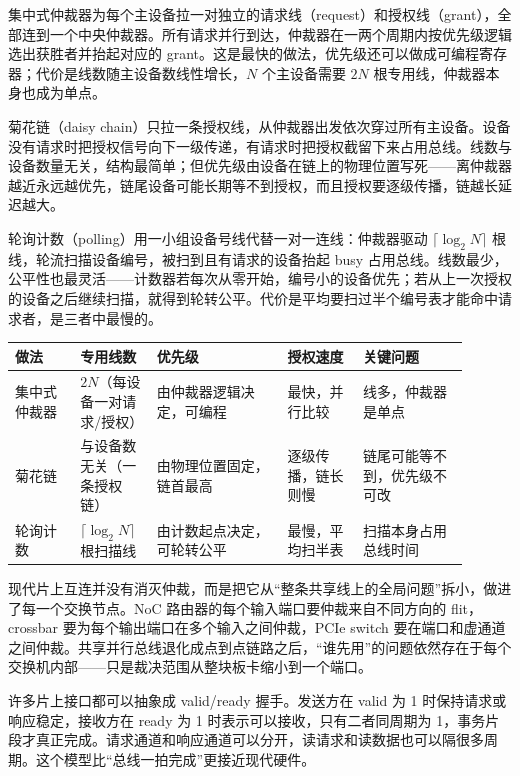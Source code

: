 集中式仲裁器为每个主设备拉一对独立的请求线（request）和授权线（grant），全部连到一个中央仲裁器。所有请求并行到达，仲裁器在一两个周期内按优先级逻辑选出获胜者并抬起对应的 grant。这是最快的做法，优先级还可以做成可编程寄存器；代价是线数随主设备数线性增长，$N$ 个主设备需要 $2N$ 根专用线，仲裁器本身也成为单点。

菊花链（daisy chain）只拉一条授权线，从仲裁器出发依次穿过所有主设备。设备没有请求时把授权信号向下一级传递，有请求时把授权截留下来占用总线。线数与设备数量无关，结构最简单；但优先级由设备在链上的物理位置写死——离仲裁器越近永远越优先，链尾设备可能长期等不到授权，而且授权要逐级传播，链越长延迟越大。

轮询计数（polling）用一小组设备号线代替一对一连线：仲裁器驱动 $\lceil\log_2 N\rceil$ 根线，轮流扫描设备编号，被扫到且有请求的设备抬起 busy 占用总线。线数最少，公平性也最灵活——计数器若每次从零开始，编号小的设备优先；若从上一次授权的设备之后继续扫描，就得到轮转公平。代价是平均要扫过半个编号表才能命中请求者，是三者中最慢的。

\begin{longtable}{L{0.13\linewidth}L{0.15\linewidth}L{0.26\linewidth}L{0.15\linewidth}L{0.21\linewidth}}
\toprule
做法 & 专用线数 & 优先级 & 授权速度 & 关键问题 \\
\midrule
集中式仲裁器 & $2N$（每设备一对请求/授权） & 由仲裁器逻辑决定，可编程 & 最快，并行比较 & 线多，仲裁器是单点 \\
菊花链 & 与设备数无关（一条授权链） & 由物理位置固定，链首最高 & 逐级传播，链长则慢 & 链尾可能等不到，优先级不可改 \\
轮询计数 & $\lceil\log_2 N\rceil$ 根扫描线 & 由计数起点决定，可轮转公平 & 最慢，平均扫半表 & 扫描本身占用总线时间 \\
\bottomrule
\end{longtable}

现代片上互连并没有消灭仲裁，而是把它从“整条共享线上的全局问题”拆小，做进了每一个交换节点。NoC 路由器的每个输入端口要仲裁来自不同方向的 flit，crossbar 要为每个输出端口在多个输入之间仲裁，PCIe switch 要在端口和虚通道之间仲裁。共享并行总线退化成点到点链路之后，“谁先用”的问题依然存在于每个交换机内部——只是裁决范围从整块板卡缩小到一个端口。

许多片上接口都可以抽象成 valid/ready 握手。发送方在 valid 为 1 时保持请求或响应稳定，接收方在 ready 为 1 时表示可以接收，只有二者同周期为 1，事务片段才真正完成。请求通道和响应通道可以分开，读请求和读数据也可以隔很多周期。这个模型比“总线一拍完成”更接近现代硬件。

